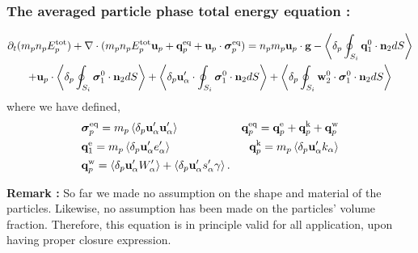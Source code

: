 \documentclass{sintefbeamer}
\begin{document}
\begin{frame}
  \frametitle{The averaged particle phase total energy equation :}
  \begin{multline*}
  \partial_t(m_p n_pE_p^\text{tot})
  + \mathbf{\nabla}\cdot(m_pn_p E_p^\text{tot} \textbf{u}_p 
  + \textbf{q}_p^\text{eq} 
  + \textbf{u}_p \cdot \bm{\sigma}_p^\text{eq})
  =  n_p m_p \textbf{u}_p\cdot  \textbf{g}
  -  \left<\delta_p \oint_{S_{i}} \textbf{q}_1^0 \cdot \textbf{n}_2 dS\right>\\
  + \textbf{u}_p \cdot\left<\delta_p \oint_{S_{i}} {\bm{\sigma}_1^0 \cdot \textbf{n}_2} dS\right>
  + \left<\delta_p \textbf{u}_\alpha' \cdot\oint_{S_{i}} \bm{\sigma}_1^0 \cdot \textbf{n}_2 dS\right>
  + \left<\delta_p \oint_{S_{i}} {\textbf{w}_2^0 \cdot\bm{\sigma}_1^0 \cdot \textbf{n}_2} dS\right>
  \end{multline*}
  where we have defined, 
\begin{align*}
    &\bm{\sigma}_p^\text{eq}
    =  m_p\left<\delta_p \textbf{u}_\alpha'\textbf{u}_\alpha'\right>
    &\textbf{q}_p^\text{eq}
    =\textbf{q}_p^\text{e} 
    +\textbf{q}_p^\text{k}  
    +\textbf{q}_p^\text{w}  
    \\
    &\textbf{q}_1^\text{e}
    = m_p \left<\delta_p \textbf{u}_\alpha' e_\alpha'\right> 
    &\textbf{q}_p^\text{k}
    = m_p \left<\delta_p \textbf{u}_\alpha' k_\alpha\right> 
    \\
    &\textbf{q}_p^\text{w}
    = 
     \left<\delta_p \textbf{u}_\alpha'W_\alpha'\right>
    + \left<\delta_p \textbf{u}_\alpha' s_\alpha' \gamma\right>.
\end{align*}

\textbf{Remark : } So far we made no assumption on the shape and material of the particles. Likewise, no assumption has been made on the particles' volume fraction.
Therefore, this equation is in principle valid for all application, upon having proper closure expression.  
\end{frame}
\end{document}
